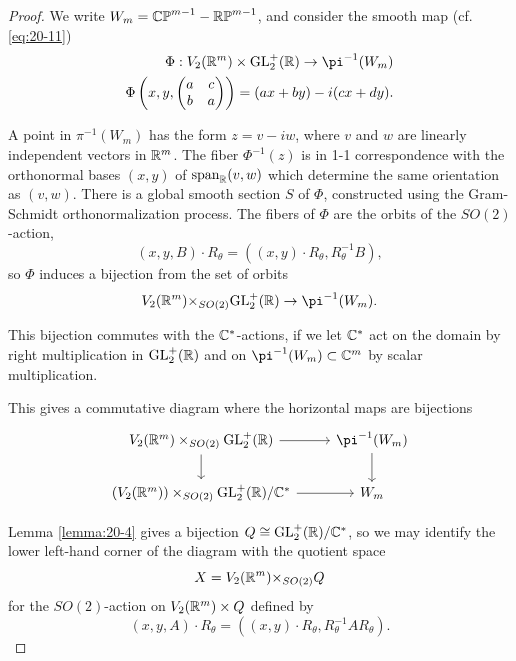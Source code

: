 \begin{proof}
  We write ${W}_{m} = {\mathbb{CP}}^{m- 1}- \mathbb{RP}^{m- 1}$, and consider the smooth map (cf. \eqref{eq:20-11})
  \begin{align*}
    \Phi  : {V}_{2}( {\RR^m})  \times  {\R{GL}_2^+}( \B{R})  \ra  {\pi }^{-1}( {W}_{m})\\
    \Phi \left(x, y, \begin{pmatrix} a & c \\  b & a \end{pmatrix}\right) = ( {{ax} + {by}}) - i( {{cx} + {dy}}).
  \end{align*}
  
  A point in ${\pi }^{-1}( {W}_{m})$ has the form $z = v- {iw}$, where $v$ and $w$ are linearly independent 
  vectors in ${{\mathbb{R}}^m}$. The fiber ${\Phi }^{-1}( z)$ is in 1-1 correspondence with the orthonormal 
  bases $(x, y)$ of ${\mathrm{span}}_{{\mathbb{R}}}( {v,w})$ which determine the same orientation as $(v, w)$. There is a 
  global smooth section $S$ of $\Phi$, constructed using the Gram-Schmidt orthonormalization process. 
  The fibers of $\Phi$ are the orbits of the ${SO}( 2)$-action,
  \[
    (x, y, B)  \cdot  {R}_{\theta} = ( {( {x,y})  \cdot  {R}_{\theta },{R}_{\theta }^{-1}B}),
  \]
  so $\Phi$ induces a bijection from the set of orbits
  \[
    {V}_{2}( {\RR^m}) { \times  }_{{SO}( 2) }{\R{GL}_2^+}( \B{R})  \ra  {\pi }^{-1}( {W}_{m}).
  \]
  
  This bijection commutes with the ${\mathbb{C}}^*$-actions, if we let ${\mathbb{C}}^*$ act on the domain 
  by right multiplication in ${\mathrm{GL}_2^+}( \mathbb{R})$ and on ${\pi }^{-1}( {W}_{m})  \subset  {\B{C}}^{m}$ 
  by scalar multiplication. 
  
  This gives a commutative diagram where the horizontal maps are bijections
  \[\begin{tikzcd}
    V_2(\RR^m)\times_{SO(2)}\R{GL}_2^+(\RR)\dar{}\rar{} & \pi^{-1}(W_m)\dar{}\\
    (V_2(\RR^m))\times_{SO(2)}\R{GL}_2^+(\RR)/\CC^*\rar{} & W_m
  \end{tikzcd}\]

  Lemma \ref{lemma:20-4} gives a bijection $Q \cong  {\ensuremath{\mathrm{GL}}_2^+}( \mathbb{R}) /{\mathbb{C}}^*$, so we may identify 
  the lower left-hand corner of the diagram with the quotient space
  \[
    X = {V}_{2}( {{\mathbb{R}}^m}) { \times  }_{{SO}( 2) }Q
  \]  
  for the ${SO}( 2)$-action on ${V}_{2}( {{\mathbb{R}}^m})  \times  Q$ defined by
  \[
    ( {x,y,A})\cdot{R}_{\theta } = ( {( {x,y})\cdot{R}_{\theta },{R}_{\theta }^{-1}A{R}_{\theta }}).
  \]
  

\end{proof}
